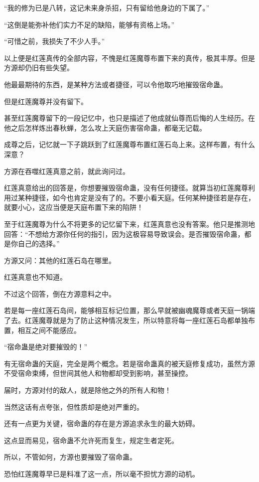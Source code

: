 \begin{this_body}
“我的修为已是八转，这记未来身杀招，只有留给他身边的下属了。”

“这倒是能弥补他们实力不足的缺陷，能够有资格上场。”

“可惜之前，我损失了不少人手。”

以上便是红莲真传的全部内容，不愧是红莲魔尊布置下来的真传，极其丰厚。但是方源却仍旧有些失望。

他最最期待的东西，是某种方法或者捷径，可以令他取巧地摧毁宿命蛊。

但是红莲魔尊并没有留下。

甚至红莲魔尊留下的一段记忆中，也只是描述了他成就仙尊而后悔的人生经历。在他之后怎样炼出春秋蝉，怎么攻上天庭伤害宿命蛊，都毫无记载。

成尊之后，记忆就一下子跳跃到了红莲魔尊布置红莲石岛上来。这样布置，有什么深意？

方源在吞噬红莲真意之前，就此询问过。

红莲真意给出的回答是，你想要摧毁宿命蛊，没有任何捷径。就算当初红莲魔尊利用过某种捷径，如今也肯定是没有了的。不要小看天庭。任何某种捷径若是存在，就要小心，这应当便是天庭布置下来的陷阱！

至于红莲魔尊为什么不将更多的记忆留下来，红莲真意也没有答案。他只是推测地回答：“不想给方源你任何的指引，因为这极容易导致误会。是否摧毁宿命蛊，都是你自己的选择。”

方源又问：其他的红莲石岛在哪里。

红莲真意也不知道。

不过这个回答，倒在方源意料之中。

若是每一座红莲石岛间，能够相互标记位置，那么早就被幽魂魔尊或者天庭一锅端了去。红莲魔尊就是为了防止这种情况发生，所以特意将每一座红莲石岛都单独布置，相互之间不能感应。

“宿命蛊是绝对要摧毁的！”

有无宿命蛊的天庭，完全是两个概念。若是宿命蛊真的被天庭修复成功，虽然方源不受宿命束缚，但世间其他人和物都却受到影响，甚至操控。

届时，方源对付的敌人，就是除他之外的所有人和物！

当然这话有点夸张，但性质却是绝对严重的。

还有一点更为关键，宿命蛊的存在是方源追求永生的最大妨碍。

这点显而易见，宿命蛊不允许死而复生，规定生者定死。

所以，不管如何，方源也要摧毁了宿命蛊。

恐怕红莲魔尊早已是料准了这一点，所以毫不担忧方源的动机。

\end{this_body}

